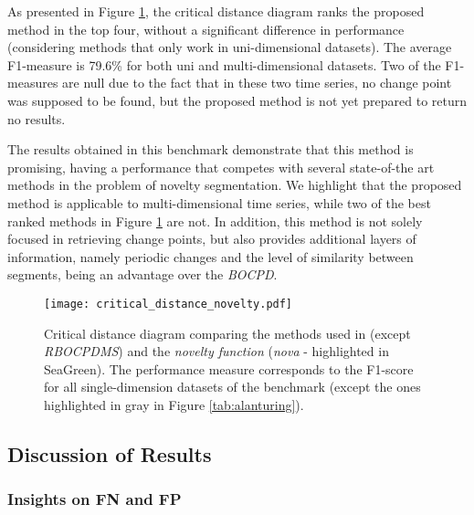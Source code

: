 As presented in Figure \ref{fig:cdd_alant}, the critical distance diagram ranks the proposed method in the top four, without a significant difference in performance (considering methods that only work in uni-dimensional datasets). The average F1-measure is 79.6\% for both uni and multi-dimensional datasets. Two of the F1-measures are null due to the fact that in these two time series, no change point was supposed to be found, but the proposed method is not yet prepared to return no results. 
\par
The results obtained in this benchmark demonstrate that this method is promising, having a performance that competes with several state-of-the art methods in the problem of novelty segmentation. We highlight that the proposed method is applicable to multi-dimensional time series, while two of the best ranked methods in Figure \ref{fig:cdd_alant} are not. In addition, this method is not solely focused in retrieving change points, but also provides additional layers of information, namely periodic changes and the level of similarity between segments, being an advantage over the \textit{BOCPD}.

\begin{figure}
    \centering
    \texttt{[image: critical\_distance\_novelty.pdf]}
    \caption{Critical distance diagram comparing the methods used in \cite{cpd_alan} (except \textit{RBOCPDMS}) and the \textit{novelty function} (\textit{nova} - highlighted in SeaGreen). The performance measure corresponds to the F1-score for all single-dimension datasets of the benchmark (except the ones highlighted in gray in Figure \ref{tab:alanturing}).}
    \label{fig:cdd_alant}
\end{figure}

\subsection{Discussion of Results}

\subsubsection{Insights on FN and FP}

